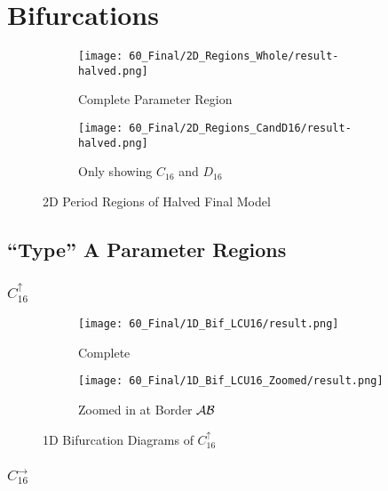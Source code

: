 \section{Bifurcations}


\begin{figure}
    \centering
    \begin{subfigure}{0.4\textwidth}
        \centering
        \texttt{[image: 60\_Final/2D\_Regions\_Whole/result-halved.png]}
        \caption{Complete Parameter Region}
        \label{fig:final.regions.whole.halved}
    \end{subfigure}
    \begin{subfigure}{0.4\textwidth}
        \centering
        \texttt{[image: 60\_Final/2D\_Regions\_CandD16/result-halved.png]}
        \caption{Only showing $C_{16}$ and $D_{16}$}
        \label{fig:final.regions.CandD16.halved}
    \end{subfigure}
    \caption{2D Period Regions of Halved Final Model}
\end{figure}


\subsection{``Type'' A Parameter Regions}

\subsubsection{$C_{16}^\uparrow$}

\begin{figure}
    \centering
    \begin{subfigure}{0.4\textwidth}
        \centering
        \texttt{[image: 60\_Final/1D\_Bif\_LCU16/result.png]}
        \caption{Complete}
        \label{fig:final.bifurcation.C.up}
    \end{subfigure}
    \begin{subfigure}{0.4\textwidth}
        \centering
        \texttt{[image: 60\_Final/1D\_Bif\_LCU16\_Zoomed/result.png]}
        \caption{Zoomed in at Border $\mathcal{A}\mathcal{B}$}
        \label{fig:bifurcation.C.up.zoomed}
    \end{subfigure}
    \caption{1D Bifurcation Diagrams of $C_{16}^\uparrow$}
\end{figure}

\subsubsection{$C_{16}^\rightarrow$}

